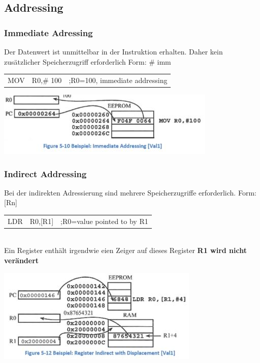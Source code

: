 \subsection{Addressing}
\begin{multicols}{2}
    \begin{minipage}{\linewidth}
        \subsubsection{Immediate Adressing}
        Der Datenwert ist unmittelbar in der Instruktion erhalten. Daher kein zusätzlicher Speicherzugriff erforderlich\newline
        Form: \# imm\newline
        \begin{tabular}{lll}
             MOV & R0,\# 100&;R0=100, immediate addressing \\ 
        \end{tabular} 
    \end{minipage}
    \includegraphics[width=0.9\linewidth]{images/immediateAddressing}    
\end{multicols}   

\begin{multicols}{2}
    \begin{minipage}{\linewidth}
        \subsubsection{Indirect Addressing}
        Bei der indirekten Adressierung sind mehrere Speicherzugriffe erforderlich.\newline
        Form: [Rn]\newline
        \begin{tabular}{lll}
            LDR & R0,[R1]&;R0=value pointed to by R1 \\ 
        \end{tabular} \\
        Ein Register enthält irgendwie eien Zeiger auf dieses Register\newline
        \textbf{R1 wird nicht verändert}
    \end{minipage}
     \includegraphics[width=0.9\linewidth]{images/indirectAddressing}    
\end{multicols} 

